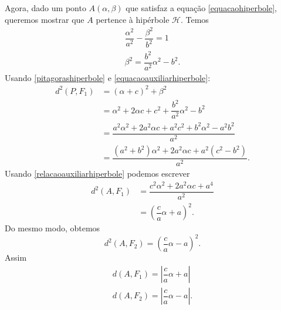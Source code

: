 Agora, dado um ponto $A(\alpha,\beta)$ que satisfaz a equação \eqref{equacaohiperbole}, queremos mostrar que $A$ pertence à hipérbole $\mathcal{H}$. Temos
\begin{align}
    \dfrac{\alpha^2}{a^2} - \dfrac{\beta^2}{b^2} = 1\nonumber \\
    \beta^2 = \dfrac{b^2}{a^2}\alpha^2 - b^2.\label{equacaoauxiliarhiperbole}
\end{align}
Usando \eqref{pitagorashiperbole} e \eqref{equacaoauxiliarhiperbole}:
\begin{align*}
    d^2(P,F_1) & = (\alpha + c)^2 + \beta^2                                                \\
               & = \alpha^2 + 2\alpha c + c^2 + \dfrac{b^2}{a^2}\alpha^2 - b^2             \\
               & = \dfrac{a^2\alpha^2 + 2a^2\alpha c + a^2c^2 + b^2\alpha^2 - a^2b^2}{a^2} \\
               & = \dfrac{(a^2 + b^2)\alpha^2 + 2a^2\alpha c + a^2(c^2 - b^2)}{a^2}.
\end{align*}
Usando \eqref{relacaoauxiliarhiperbole} podemos escrever
\begin{align*}
    d^2(A,F_1) & = \dfrac{c^2\alpha^2 + 2a^2\alpha c + a^4}{a^2} \\
               & = \left(\dfrac{c}{a}\alpha + a\right)^2.
\end{align*}
Do mesmo modo, obtemos
\[
    d^2(A,F_2) = \left(\dfrac{c}{a}\alpha - a\right)^2.
\]
Assim
\begin{align}
    d(A,F_1) = \left|\dfrac{c}{a}\alpha + a\right| \\
    d(A,F_2) = \left|\dfrac{c}{a}\alpha - a\right|.
\end{align}

